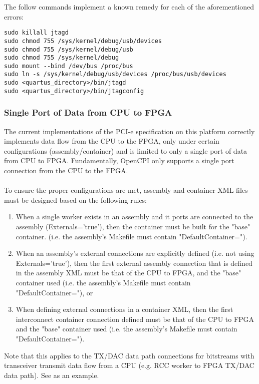 \documentclass{article}
\begin{document}
\noindent The follow commands implement a known remedy for each of the aforementioned errors:
\begin{lstlisting}
sudo killall jtagd
sudo chmod 755 /sys/kernel/debug/usb/devices
sudo chmod 755 /sys/kernel/debug/usb
sudo chmod 755 /sys/kernel/debug
sudo mount --bind /dev/bus /proc/bus
sudo ln -s /sys/kernel/debug/usb/devices /proc/bus/usb/devices
sudo <quartus_directory>/bin/jtagd
sudo <quartus_directory>/bin/jtagconfig
\end{lstlisting}

\subsubsection*{Single Port of Data from CPU to FPGA} %
\label{bug:3783}
The current implementations of the PCI-e specification on this platform correctly implements data flow from the CPU to the FPGA, only under certain configurations (assembly/container) and is limited to only a single port of data from CPU to FPGA. Fundamentally, OpenCPI only supports a single port connection from the CPU to the FPGA. \\ \\
To ensure the proper configurations are met, assembly and container XML files must be designed based on the following rules:
\begin{enumerate}
\item When a single worker exists in an assembly and it ports are connected to the assembly (Externals='true'), then
the container must be built for the "base" container. (i.e. the assembly's Makefile must contain "DefaultContainer=").
\item When an assembly's external connections are explicitly defined (i.e. not using Externals='true'), then the first external assembly connection that is defined in the assembly XML must be that of the CPU to FPGA, and the "base" container used (i.e. the assembly's Makefile must contain "DefaultContainer="), or
\item When defining external connections in a container XML, then the first interconnect container connection defined must be that of the CPU to FPGA and the "base" container used (i.e. the assembly's Makefile must contain "DefaultContainer=").
\end{enumerate}
Note that this applies to the TX/DAC data path connections for bitstreams with transceiver transmit data flow from a CPU (e.g. RCC worker to FPGA TX/DAC data path). See  as an example.
\end{document}

